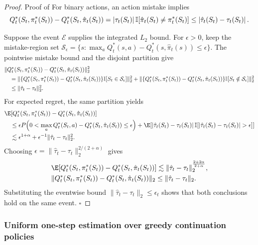 \documentclass[opre,nonblindrev]{informs4}
\newcommand{\norm}[1]{\lVert#1\rVert}
\newcommand{\blipadv}{\tau}
\renewcommand{\qed}{\unskip\nobreak\hfill\ensuremath{\square}}
\begin{document}
\begin{proof}{Proof of }
For binary actions, an action mistake implies
\[
Q_t^*(S_t,\pi_t^*(S_t))-Q_t^*(S_t,\hat\pi_t(S_t))
=\abs{\blipadv_t(S_t)}\mathbb I[\hat\pi_t(S_t)\ne\pi_t^*(S_t)]
\leq\abs{\hat\blipadv_t(S_t)-\blipadv_t(S_t)}.
\]

Suppose the event $\mathcal E$ supplies the integrated $L_2$ bound. For
$\epsilon>0$, keep
the mistake-region set
$\mathcal S_\epsilon=
\{s:\max_a Q_t^*(s,a)-Q_t^*(s,\hat\pi_t(s))\le\epsilon\}$.
The pointwise mistake bound and the disjoint partition give
\begin{align}
&\norm{
Q_t^*(S_t,\pi_t^*(S_t))-Q_t^*(S_t,\hat\pi_t(S_t))
}_2^2\notag\\
&\quad=
\norm{
\{Q_t^*(S_t,\pi_t^*(S_t))-Q_t^*(S_t,\hat\pi_t(S_t))\}
\mathbb I[S_t\in\mathcal S_\epsilon]
}_2^2\notag+
\norm{
\{Q_t^*(S_t,\pi_t^*(S_t))-Q_t^*(S_t,\hat\pi_t(S_t))\}
\mathbb I[S_t\notin\mathcal S_\epsilon]
}_2^2\notag\\
&\quad
\le
\norm{\hat\blipadv_t-\blipadv_t}_2^2.
\label{eqn-mistakeregion-ltwo}
\end{align}
For expected regret, the same partition yields
\begin{align*}
&\E[
Q_t^*(S_t,\pi_t^*(S_t))-Q_t^*(S_t,\hat\pi_t(S_t))
]\\
&\quad\leq
\epsilon
P\!\left(
0<\max_a Q_t^*(S_t,a)-Q_t^*(S_t,\hat\pi_t(S_t))
\le\epsilon
\right)
+
\E[
\abs{\hat\blipadv_t(S_t)-\blipadv_t(S_t)}
\mathbb I[\abs{\hat\blipadv_t(S_t)-\blipadv_t(S_t)}
>\epsilon]
]\\
&\quad\lesssim
\epsilon^{1+\alpha}
+\epsilon^{-1}
\norm{\hat\blipadv_t-\blipadv_t}_2^2.
\end{align*}
Choosing
$\epsilon=\norm{\hat\blipadv_t-\blipadv_t}_2^{2/(2+\alpha)}$
gives
\begin{align*}
&\E[
Q_t^*(S_t,\pi_t^*(S_t))-Q_t^*(S_t,\hat\pi_t(S_t))
] \lesssim
\norm{\hat\blipadv_t-\blipadv_t}_2^
{\frac{2+2\alpha}{2+\alpha}},\\
&\norm{
Q_t^*(S_t,\pi_t^*(S_t))-Q_t^*(S_t,\hat\pi_t(S_t))
}_2\leq
\norm{\hat\blipadv_t-\blipadv_t}_2.
\end{align*}
Substituting the eventwise bound
$\norm{\hat\blipadv_t-\blipadv_t}_2\leq\epsilon_t$
shows that both conclusions hold on the same event. \qed
\end{proof}

\subsubsection{Uniform one-step estimation over greedy continuation policies}
\label{sec:ec-uniform-greedy}
\end{document}
